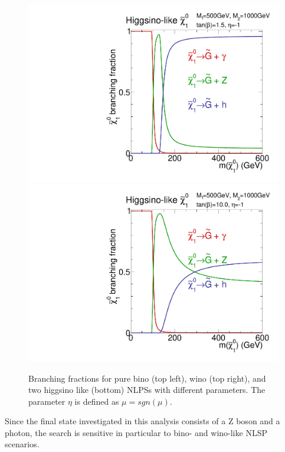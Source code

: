 \begin{figure}[htb]
 \includegraphics[width=\pairwidth]{figures/signal/higgsinoBranching1}
 \includegraphics[width=\pairwidth]{figures/signal/higgsinoBranching2}
 \caption{Branching fractions for pure bino (top left), wino (top right), and two higgsino like (bottom) NLPSs with different parameters. The parameter $\eta$ is defined as $\mu=sgn(\mu)$.}
 \label{fig:BRNLSP}
\end{figure}
Since the final state investigated in this analysis consists of a Z boson and a photon, the search is sensitive in particular to bino- and wino-like NLSP scenarios.\\
